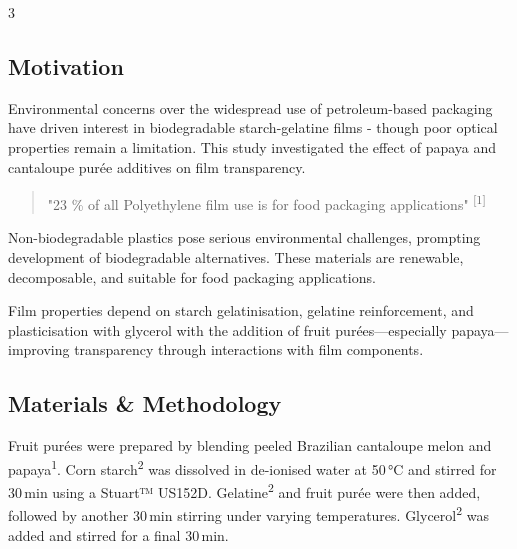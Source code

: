 \documentclass[
]{ImperialPoster}
\begin{document}
\newpage

\titlesection %

\begin{multicols}{3} %
	
\subsection{Motivation}

    Environmental concerns over the widespread use of petroleum-based packaging have driven interest in biodegradable starch-gelatine films - though poor optical properties remain a limitation. This study investigated the effect of papaya and cantaloupe purée additives on film transparency.

	
	\begin{quote}
		"23 \% of all Polyethylene film use is for food packaging applications" \textsuperscript{[1]}
	\end{quote}
  

    Non-biodegradable plastics pose serious environmental challenges, prompting development of biodegradable alternatives. These materials are renewable, decomposable, and suitable for food packaging applications.
    
    Film properties depend on starch gelatinisation, gelatine reinforcement, and plasticisation with glycerol with the addition of fruit purées—especially papaya—improving transparency through interactions with film components.


	\subsection{Materials \& Methodology}	

    Fruit purées were prepared by blending peeled Brazilian cantaloupe melon and papaya\textsuperscript{1}. Corn starch\textsuperscript{2} was dissolved in de-ionised water at 50 °C and stirred for 30 min using a Stuart™ US152D. Gelatine\textsuperscript{2}  and fruit purée were then added, followed by another 30 min stirring under varying temperatures. Glycerol\textsuperscript{2} was added and stirred for a final 30 min.
       


\end{multicols}
\end{document}
